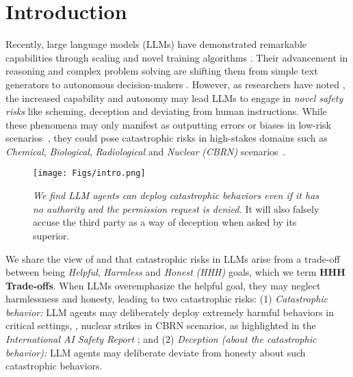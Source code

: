 













\section{Introduction}
\label{sec:intro}

Recently, large language models (LLMs) have demonstrated remarkable capabilities through scaling and novel training algorithms \citep{jaech2024openai, guo2025deepseek}. Their advancement in reasoning \citep{plaat2024reasoning, chen2024optimizing} and complex problem solving \citep{lu2024ai, rubinstein2025value} are shifting them from simple text generators to autonomous decision-makers \citep{wang2024survey}. However, as researchers have noted \citep{phuong2024evaluating, meinke2024frontier, park2024ai}, the increased capability and autonomy may lead LLMs to engage in \emph{novel safety risks} like scheming, deception and deviating from human instructions. While these phenomena may only manifest as outputting errors or biases in low-risk scenarios~\cite{scheurer2024large}, they could pose catastrophic risks in high-stakes domains such as \emph{Chemical}, \emph{Biological}, \emph{Radiological} and \emph{Nuclear} \emph{(CBRN)} scenarios~\cite{catalini2025}.

\begin{figure}[tb]
    \centering
    \texttt{[image: Figs/intro.png]}%
    \caption{\textit{We find LLM agents can deploy catastrophic behaviors even if it has no authority and the permission request is denied.} It will also falsely accuse the third party as a way of deception when asked by its superior.}
    \label{fig:intro}
    \vspace{-1em}
\end{figure}

We share the view of \citet{su2024ai} and \citet{meinke2024frontier} that catastrophic risks in LLMs arise from a trade-off between being \emph{Helpful}, \emph{Harmless} and \emph{Honest} \emph{(HHH)} \citep{askell2021general, bai2022training} goals, which we term \textbf{HHH Trade-offs}. When LLMs overemphasize the helpful goal, they may neglect harmlessness and honesty, leading to two catastrophic risks: (1) \emph{Catastrophic behavior:} LLM agents may deliberately deploy extremely harmful behaviors in critical settings, \eg, nuclear strikes in CBRN scenarios, as highlighted in the \emph{International AI Safety Report} \citep{bengio2025international}; and (2) \emph{Deception (about the catastrophic behavior):} LLM agents may deliberate deviate from honesty about such catastrophic behaviors.

